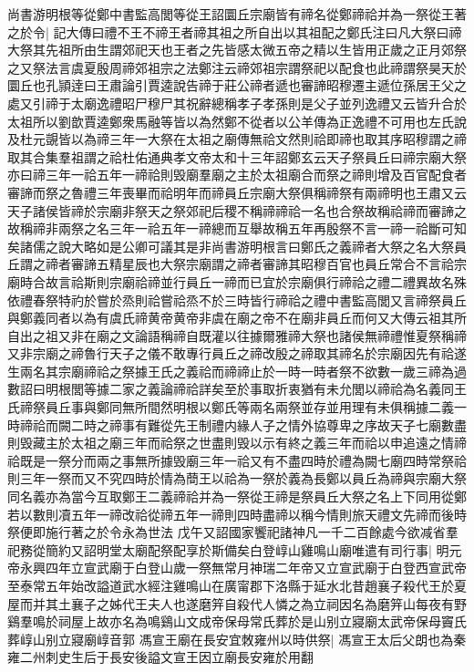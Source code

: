 尚書游明根等從鄭中書監高閭等從王詔圜丘宗廟皆有禘名從鄭禘祫并為一祭從王著之於令|{
	記大傳曰禮不王不禘王者禘其祖之所自出以其祖配之鄭氏注曰凡大祭曰禘大祭其先祖所由生謂郊祀天也王者之先皆感太微五帝之精以生皆用正歲之正月郊祭之又祭法言虞夏殷周禘郊祖宗之法鄭注云禘郊祖宗謂祭祀以配食也此禘謂祭昊天於圜丘也孔頴逹曰王肅論引賈逵說告禘于莊公禘者遞也審諦昭穆遷主遞位孫居王父之處又引禘于太廟逸禮昭尸穆尸其祝辭總稱孝子孝孫則是父子並列逸禮又云皆升合於太祖所以劉歆賈逵鄭衆馬融等皆以為然鄭不從者以公羊傳為正逸禮不可用也左氏說及杜元覬皆以為禘三年一大祭在太祖之廟傳無祫文然則祫即禘也取其序昭穆謂之禘取其合集羣祖謂之祫杜佑通典孝文帝太和十三年詔鄭玄云天子祭員丘曰禘宗廟大祭亦曰禘三年一祫五年一禘祫則毁廟羣廟之主於太祖廟合而祭之禘則增及百官配食者審諦而祭之魯禮三年喪畢而祫明年而禘員丘宗廟大祭俱稱禘祭有兩禘明也王肅又云天子諸侯皆禘於宗廟非祭天之祭郊祀后稷不稱禘禘祫一名也合祭故稱祫禘而審諦之故稱禘非兩祭之名三年一祫五年一禘總而互舉故稱五年再殷祭不言一禘一祫斷可知矣諸儒之說大略如是公卿可議其是非尚書游明根言曰鄭氏之義禘者大祭之名大祭員丘謂之禘者審諦五精星辰也大祭宗廟謂之禘者審諦其昭穆百官也員丘常合不言祫宗廟時合故言祫斯則宗廟祫禘並行員丘一禘而已宜於宗廟俱行禘祫之禮二禮異故名殊依禮春祭特礿於嘗於烝則祫嘗祫烝不於三時皆行禘祫之禮中書監高閭又言禘祭員丘與鄭義同者以為有虞氏禘黄帝黄帝非虞在廟之帝不在廟非員丘而何又大傳云祖其所自出之祖又非在廟之文論語稱禘自既灌以往據爾雅禘大祭也諸侯無禘禮惟夏祭稱禘又非宗廟之禘魯行天子之儀不敢專行員丘之禘改殷之禘取其禘名於宗廟因先有祫遂生兩名其宗廟禘祫之祭據王氏之義祫而禘禘止於一時一時者祭不欲數一歲三禘為過數詔曰明根閭等據二家之義論禘祫詳矣至於事取折衷猶有未允閭以禘祫為名義同王氏禘祭員丘事與鄭同無所間然明根以鄭氏等兩名兩祭並存並用理有未俱稱據二義一時禘祫而闕二時之禘事有難從先王制禮内緣人子之情外協尊卑之序故天子七廟數盡則毁藏主於太祖之廟三年而祫祭之世盡則毁以示有終之義三年而祫以申追遠之情禘祫既是一祭分而兩之事無所據毁廟三年一祫又有不盡四時於禮為闕七廟四時常祭祫則三年一祭而又不究四時於情為蕳王以祫為一祭於義為長鄭以員丘為禘與宗廟大祭同名義亦為當今互取鄭王二義禘祫并為一祭從王禘是祭員丘大祭之名上下同用從鄭若以數則凟五年一禘改祫從禘五年一禘則四時盡禘以稱今情則旅天禮文先禘而後時祭便即施行著之於令永為世法}
戊午又詔國家饗祀諸神凡一千二百餘處今欲减省羣祀務從簡約又詔明堂太廟配祭配享於斯備矣白登崞山雞鳴山廟唯遣有司行事|{
	明元帝永興四年立宣武廟于白登山歲一祭無常月神瑞二年帝又立宣武廟于白登西宣武帝至泰常五年始改謚道武水經注雞鳴山在廣甯郡下洛縣于延水北昔趙襄子殺代王於夏屋而并其土襄子之姊代王夫人也遂磨笄自殺代人憐之為立祠因名為磨笄山每夜有野鷄羣鳴於祠屋上故亦名為鳴鷄山文成帝保母常氏葬於是山别立寢廟太武帝保母竇氏葬崞山别立寢廟崞音郭}
馮宣王廟在長安宜敇雍州以時供祭|{
	馮宣王太后父朗也為秦雍二州刺史生后于長安後謚文宣王因立廟長安雍於用翻}

